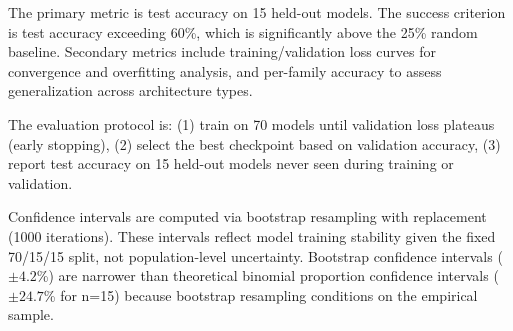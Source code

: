 The primary metric is test accuracy on 15 held-out models. The success criterion is test accuracy exceeding 60\%, which is significantly above the 25\% random baseline. Secondary metrics include training/validation loss curves for convergence and overfitting analysis, and per-family accuracy to assess generalization across architecture types.

The evaluation protocol is: (1) train on 70 models until validation loss plateaus (early stopping), (2) select the best checkpoint based on validation accuracy, (3) report test accuracy on 15 held-out models never seen during training or validation.

Confidence intervals are computed via bootstrap resampling with replacement (1000 iterations). These intervals reflect model training stability given the fixed 70/15/15 split, not population-level uncertainty. Bootstrap confidence intervals ($\pm 4.2$\%) are narrower than theoretical binomial proportion confidence intervals ($\pm 24.7$\% for n=15) because bootstrap resampling conditions on the empirical sample.
